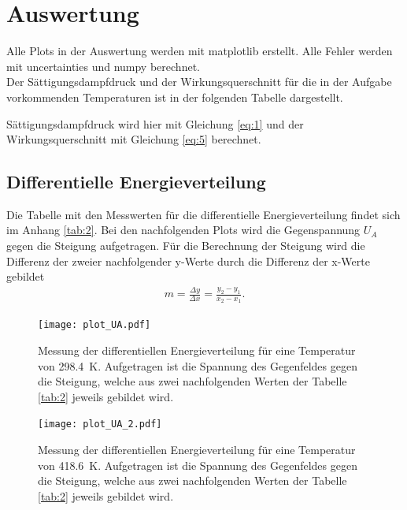 
\section{Auswertung}
Alle Plots in der Auswertung werden mit matplotlib \cite{matplotlib} erstellt.
Alle Fehler werden mit uncertainties \cite{uncertainties} und numpy \cite{numpy} berechnet.\\
Der Sättigungsdampfdruck und der Wirkungsquerschnitt für die in der Aufgabe vorkommenden
Temperaturen ist in der folgenden Tabelle dargestellt.

 Sättigungsdampfdruck wird hier mit Gleichung \eqref{eq:1} und der Wirkungsquerschnitt 
mit Gleichung \eqref{eq:5} berechnet.

\subsection{Differentielle Energieverteilung}

Die Tabelle mit den Messwerten für die differentielle Energieverteilung findet sich im Anhang \ref{tab:2}.
Bei den nachfolgenden Plots wird die Gegenspannung $U_A$ gegen die Steigung
aufgetragen. Für die Berechnung der Steigung wird die Differenz der zweier nachfolgender
y-Werte durch die Differenz der x-Werte gebildet
\begin{align}
    m = \frac{\Delta y}{\Delta x}=\frac{y_2-y_1}{x_2-x_1} \label{eq:6}.
\end{align}

\begin{figure}[H]
    \centering
    \texttt{[image: plot\_UA.pdf]}
    \caption{
        Messung der differentiellen Energieverteilung für eine Temperatur von \SI{298.4}{\kelvin}.
        Aufgetragen ist die Spannung des Gegenfeldes gegen die Steigung, welche aus
        zwei nachfolgenden Werten der Tabelle \ref{tab:2} jeweils gebildet wird.
    } 
    \label{fig:5}
\end{figure}
\begin{figure}[H]
    \centering
    \texttt{[image: plot\_UA\_2.pdf]}
    \caption{
        Messung der differentiellen Energieverteilung für eine Temperatur von \SI{418.6}{\kelvin}.
        Aufgetragen ist die Spannung des Gegenfeldes gegen die Steigung, welche aus
        zwei nachfolgenden Werten der Tabelle \ref{tab:2} jeweils gebildet wird.
    } 
    \label{fig:6}
\end{figure}

